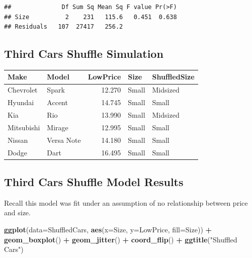 \documentclass[]{book}
\newenvironment{Shaded}{\begin{snugshade}}{\end{snugshade}}
\newcommand{\KeywordTok}[1]{\textcolor[rgb]{0.13,0.29,0.53}{\textbf{#1}}}
\newcommand{\DataTypeTok}[1]{\textcolor[rgb]{0.13,0.29,0.53}{#1}}
\newcommand{\DecValTok}[1]{\textcolor[rgb]{0.00,0.00,0.81}{#1}}
\newcommand{\StringTok}[1]{\textcolor[rgb]{0.31,0.60,0.02}{#1}}
\newcommand{\OperatorTok}[1]{\textcolor[rgb]{0.81,0.36,0.00}{\textbf{#1}}}
\newcommand{\NormalTok}[1]{#1}
\begin{document}
\begin{verbatim}
##              Df Sum Sq Mean Sq F value Pr(>F)
## Size          2    231   115.6   0.451  0.638
## Residuals   107  27417   256.2
\end{verbatim}

\subsection{Third Cars Shuffle
Simulation}\label{third-cars-shuffle-simulation-1}

\begin{Shaded}
\end{Shaded}

\begin{tabular}{l|l|r|l|l}
\hline
Make & Model & LowPrice & Size & ShuffledSize\\
\hline
Chevrolet & Spark & 12.270 & Small & Midsized\\
\hline
Hyundai & Accent & 14.745 & Small & Small\\
\hline
Kia & Rio & 13.990 & Small & Midsized\\
\hline
Mitsubishi & Mirage & 12.995 & Small & Small\\
\hline
Nissan & Versa Note & 14.180 & Small & Small\\
\hline
Dodge & Dart & 16.495 & Small & Small\\
\hline
\end{tabular}

\subsection{Third Cars Shuffle Model
Results}\label{third-cars-shuffle-model-results-1}

Recall this model was fit under an assumption of no relationship between
price and size.

\begin{Shaded}
\begin{Highlighting}[]
\KeywordTok{ggplot}\NormalTok{(}\DataTypeTok{data=}\NormalTok{ShuffledCars, }\KeywordTok{aes}\NormalTok{(}\DataTypeTok{x=}\NormalTok{Size, }\DataTypeTok{y=}\NormalTok{LowPrice, }\DataTypeTok{fill=}\NormalTok{Size)) }\OperatorTok{+}\StringTok{ }
\StringTok{  }\KeywordTok{geom_boxplot}\NormalTok{() }\OperatorTok{+}\StringTok{ }\KeywordTok{geom_jitter}\NormalTok{() }\OperatorTok{+}\StringTok{ }\KeywordTok{coord_flip}\NormalTok{() }\OperatorTok{+}\StringTok{ }\KeywordTok{ggtitle}\NormalTok{(}\StringTok{"Shuffled Cars"}\NormalTok{)}
\end{Highlighting}
\end{Shaded}
\end{document}
